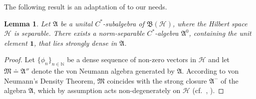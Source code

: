 \documentclass[11pt,twoside,openright]{report}
\theoremstyle{definition}
\theoremstyle{plain}
\newtheorem{Lem}[Def]{Lemma}
\theoremstyle{remark}
\theoremstyle{assumption}
\newcommand{\bset}[1]{\bigl\{ #1 \bigr\}}
\newcommand{\Nbb}{\mathbb{N}}
\newcommand{\Afrak}{\mathfrak{A}}
\newcommand{\Mfrak}{\mathfrak{M}}
\newcommand{\Hscr}{\mathscr{H}}
\newcommand{\unit}{\mathbf{1}}
\newcommand{\BH}{\mathfrak{B} ( \mathscr{H} )}
\begin{document}
The following result is an adaptation of
\cite[Lemma~14.1.17]{kadison/ringrose:1986} to our needs.
\begin{Lem}
  Let $\Afrak$ be a unital $C^*$-subalgebra of $\BH$, where the
  Hilbert space $\Hscr$ is separable. There exists a norm-separable
  $C^*$-algebra $\Afrak^0$, containing the unit element $\unit$, that
  lies strongly dense in $\Afrak$.
\end{Lem}
\begin{proof}
  Let $\bset{\phi_n}_{n \in \Nbb}$ be a dense sequence of non-zero
  vectors in $\Hscr$ and let $\Mfrak \doteq \Afrak''$ denote the von
  Neumann algebra generated by $\Afrak$. According to von Neumann's
  Density Theorem, $\Mfrak$ coincides with the strong closure
  $\Afrak^-$ of the algebra $\Afrak$, which by assumption acts
  non-degenerately on $\Hscr$ (cf.~\cite[Section~I.3.4]{dixmier:1981},
  \cite[Corollary~2.4.15]{bratteli/robinson:1987}).


\end{proof}
\end{document}

